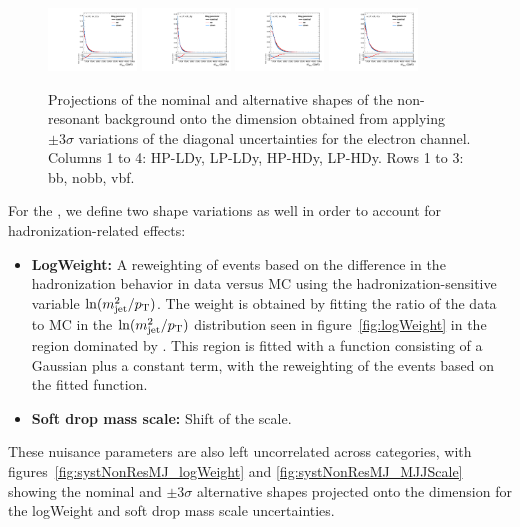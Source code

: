 \begin{figure}[htbp]
  \includegraphics[width=0.21\textwidth]{fig/uncertainties/systs_nonRes_e_HP_vbf_LDy_Diag_ProjX.pdf}
  \includegraphics[width=0.21\textwidth]{fig/uncertainties/systs_nonRes_e_LP_vbf_LDy_Diag_ProjX.pdf}
  \includegraphics[width=0.21\textwidth]{fig/uncertainties/systs_nonRes_e_HP_vbf_HDy_Diag_ProjX.pdf}
  \includegraphics[width=0.21\textwidth]{fig/uncertainties/systs_nonRes_e_LP_vbf_HDy_Diag_ProjX.pdf}\\
  \caption{
    Projections of the nominal and alternative shapes of the non-resonant background onto the \MVV dimension obtained from applying $\pm3\sigma$ variations of the diagonal uncertainties for the electron channel.
    Columns 1 to 4: HP-LDy, LP-LDy, HP-HDy, LP-HDy.
    Rows 1 to 3: bb, nobb, vbf.
  }
  \label{fig:systNonResMVV_Diag}
\end{figure}

For the \MJ, we define two shape variations as well in order to account for hadronization-related effects:
\begin{itemize}
  \item {\bfseries LogWeight:} A reweighting of events based on the difference in the hadronization behavior in data versus MC using the hadronization-sensitive variable $\ln(m_\mathrm{jet}^2/p_\mathrm{T})$.
  The weight is obtained by fitting the ratio of the data to MC in the $\ln(m_\mathrm{jet}^2/p_\mathrm{T})$ distribution seen in figure~\ref{fig:logWeight} in the region dominated by \Wjets.
  This region is fitted with a function consisting of a Gaussian plus a constant term, with the reweighting of the events based on the fitted function.
  \item {\bfseries Soft drop mass scale:} Shift of the \MJ scale.
\end{itemize}
These nuisance parameters are also left uncorrelated across categories, with figures~\ref{fig:systNonResMJ_logWeight} and \ref{fig:systNonResMJ_MJJScale} showing the nominal and $\pm3\sigma$ alternative shapes projected onto the \MJ dimension for the logWeight and soft drop mass scale uncertainties.

